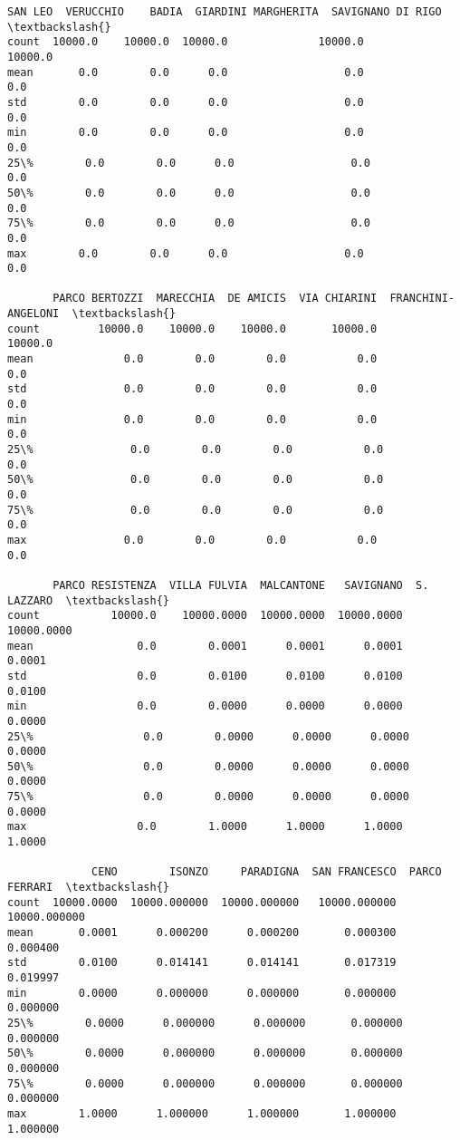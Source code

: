 \documentclass[11pt]{article}
\begin{document}
\begin{tcolorbox}[breakable, size=fbox, boxrule=.5pt, pad at break*=1mm, opacityfill=0]
\begin{Verbatim}[commandchars=\\\{\}]
       SAN LEO  VERUCCHIO    BADIA  GIARDINI MARGHERITA  SAVIGNANO DI RIGO  \textbackslash{}
count  10000.0    10000.0  10000.0              10000.0            10000.0
mean       0.0        0.0      0.0                  0.0                0.0
std        0.0        0.0      0.0                  0.0                0.0
min        0.0        0.0      0.0                  0.0                0.0
25\%        0.0        0.0      0.0                  0.0                0.0
50\%        0.0        0.0      0.0                  0.0                0.0
75\%        0.0        0.0      0.0                  0.0                0.0
max        0.0        0.0      0.0                  0.0                0.0

       PARCO BERTOZZI  MARECCHIA  DE AMICIS  VIA CHIARINI  FRANCHINI-ANGELONI  \textbackslash{}
count         10000.0    10000.0    10000.0       10000.0             10000.0
mean              0.0        0.0        0.0           0.0                 0.0
std               0.0        0.0        0.0           0.0                 0.0
min               0.0        0.0        0.0           0.0                 0.0
25\%               0.0        0.0        0.0           0.0                 0.0
50\%               0.0        0.0        0.0           0.0                 0.0
75\%               0.0        0.0        0.0           0.0                 0.0
max               0.0        0.0        0.0           0.0                 0.0

       PARCO RESISTENZA  VILLA FULVIA  MALCANTONE   SAVIGNANO  S. LAZZARO  \textbackslash{}
count           10000.0    10000.0000  10000.0000  10000.0000  10000.0000
mean                0.0        0.0001      0.0001      0.0001      0.0001
std                 0.0        0.0100      0.0100      0.0100      0.0100
min                 0.0        0.0000      0.0000      0.0000      0.0000
25\%                 0.0        0.0000      0.0000      0.0000      0.0000
50\%                 0.0        0.0000      0.0000      0.0000      0.0000
75\%                 0.0        0.0000      0.0000      0.0000      0.0000
max                 0.0        1.0000      1.0000      1.0000      1.0000

             CENO        ISONZO     PARADIGNA  SAN FRANCESCO  PARCO FERRARI  \textbackslash{}
count  10000.0000  10000.000000  10000.000000   10000.000000   10000.000000
mean       0.0001      0.000200      0.000200       0.000300       0.000400
std        0.0100      0.014141      0.014141       0.017319       0.019997
min        0.0000      0.000000      0.000000       0.000000       0.000000
25\%        0.0000      0.000000      0.000000       0.000000       0.000000
50\%        0.0000      0.000000      0.000000       0.000000       0.000000
75\%        0.0000      0.000000      0.000000       0.000000       0.000000
max        1.0000      1.000000      1.000000       1.000000       1.000000


\end{Verbatim}
\end{tcolorbox}
\end{document}
